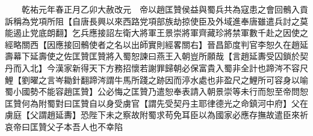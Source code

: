 　　乾祐元年春正月乙卯大赦改元　帝以趙匡贊侯益與蜀兵共為寇患之會回鶻入貢訴稱為党項所阻【自唐長興以來西路党項部族劫掠使臣及外域進奉唐雖遣兵討之莫能遏止党底朗翻】乞兵應接詔左衛大將軍王景崇將軍齊藏珍將禁軍數千赴之因使之經略關西【因應接回鶻使者之名以出師實則經畧關右】晉昌節度判官李恕久在趙延壽幕下延壽使之佐匡贊匡贊將入蜀恕諫曰燕王入朝豈所願哉【言趙延夀受囚鎖於契丹而入北】今漢家新得天下方務招懷若謝罪歸朝必保富貴入蜀非全計也蹄涔不容尺鯉【劉曜之言岑耡針翻蹄涔謂牛馬所踐之跡因而渟水處也非盈尺之鯉所可容身以喻蜀小國勢不能容趙匡贊】公必悔之匡贊乃遣恕奉表請入朝景崇等未行而恕至帝問恕匡贊何為附蜀對曰匡贊自以身受虜官【謂先受契丹主耶律德光之命鎮河中府】父在虜庭【父謂趙延夀】恐陛下未之察故附蜀求苟免耳臣以為國家必應存撫故遣臣來祈哀帝曰匡贊父子本吾人也不幸陷